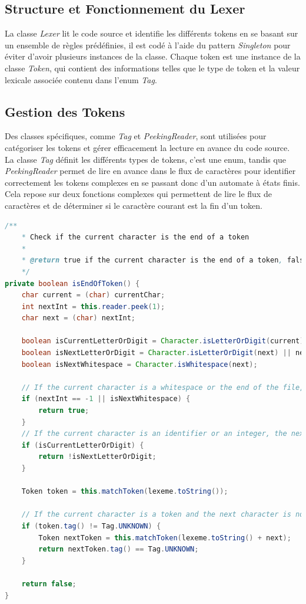 \documentclass[french,a4paper]{article}
\begin{document}
    \subsection{Structure et Fonctionnement du Lexer}\label{subsec:structure-et-fonctionnement-du-lexer}

    La classe \textit{Lexer} lit le code source et identifie les différents tokens en se basant sur un ensemble de règles prédéfinies, il est codé à l'aide du pattern \textit{Singleton} pour éviter d'avoir plusieurs instances de la classe.
    Chaque token est une instance de la classe \textit{Token}, qui contient des informations telles que le type de token et la valeur lexicale associée contenu dans l'enum \textit{Tag}.

    \subsection{Gestion des Tokens}\label{subsec:gestion-des-tokens}

    Des classes spécifiques, comme \textit{Tag} et \textit{PeekingReader}, sont utilisées pour catégoriser les tokens et gérer efficacement la lecture en avance du code source.
    La classe \textit{Tag} définit les différents types de tokens, c'est une enum, tandis que \textit{PeekingReader} permet de lire en avance dans le flux de caractères pour identifier correctement les tokens complexes en se passant donc d'un automate à états finis.
    Cela repose sur deux fonctions complexes qui permettent de lire le flux de caractères et de déterminer si le caractère courant est la fin d'un token.

    \begin{lstlisting}[language=Java,label={lst:lstlisting1}]
/**
    * Check if the current character is the end of a token
    *
    * @return true if the current character is the end of a token, false otherwise
    */
private boolean isEndOfToken() {
    char current = (char) currentChar;
    int nextInt = this.reader.peek(1);
    char next = (char) nextInt;

    boolean isCurrentLetterOrDigit = Character.isLetterOrDigit(current) || current == '_';
    boolean isNextLetterOrDigit = Character.isLetterOrDigit(next) || next == '_';
    boolean isNextWhitespace = Character.isWhitespace(next);

    // If the current character is a whitespace or the end of the file, the current character is the end of the token
    if (nextInt == -1 || isNextWhitespace) {
        return true;
    }
    // If the current character is an identifier or an integer, the next character must not be a letter or a digit
    if (isCurrentLetterOrDigit) {
        return !isNextLetterOrDigit;
    }

    Token token = this.matchToken(lexeme.toString());

    // If the current character is a token and the next character is not a token, the current character is the end of the token
    if (token.tag() != Tag.UNKNOWN) {
        Token nextToken = this.matchToken(lexeme.toString() + next);
        return nextToken.tag() == Tag.UNKNOWN;
    }

    return false;
}
    \end{lstlisting}
\end{document}
